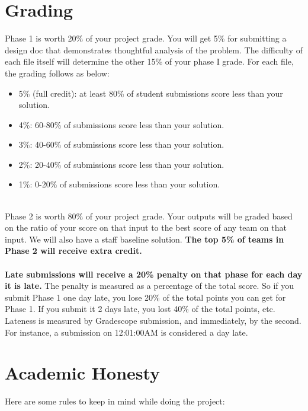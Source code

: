 \documentclass{article}
\begin{document}
\section*{Grading}
Phase 1 is worth 20\% of your project grade. You will get 5\% for submitting a design doc that demonstrates thoughtful analysis of the problem. The difficulty of each file itself will determine the other 15\% of your phase I grade. For each file, the grading follows as below:
\begin{itemize}
    \item 5\% (full credit): at least 80\% of student submissions score less than your solution.
    \item 4\%: 60-80\% of submissions score less than your solution.
    \item 3\%: 40-60\% of submissions score less than your solution.
    \item 2\%: 20-40\% of submissions score less than your solution.
    \item 1\%: 0-20\% of submissions score less than your solution. \\
\end{itemize}
\\
Phase 2 is worth 80\% of your project grade. Your outputs will be graded based on the ratio of your score on that input to the best score of any team on that input. We will also have a staff baseline solution. \textbf{The top 5\% of teams in Phase 2 will receive extra credit.}
\\\\
\textbf{Late submissions will receive a 20\% penalty on that phase for each day it is late.} The penalty is measured as a percentage of the total score. So if you submit Phase 1 one day late, you lose 20\% of the total points you can get for Phase 1. If you submit it 2 days late, you lost 40\% of the total points, etc. Lateness is measured by Gradescope submission, and immediately, by the second. For instance, a submission on 12:01:00AM is considered a day late.

\section*{Academic Honesty}
Here are some rules to keep in mind while doing the project:
\end{document}
